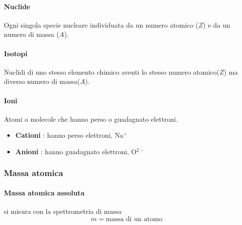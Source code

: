 \documentclass[twoside]{article}
\begin{document}
\paragraph[short]{Nuclide}
Ogni singola specie nucleare individuata da un numero atomico (\(Z\)) e da un numero di massa (\(A\)).
\begin{figure}[H]
  \centering
\end{figure}
\paragraph[short]{Isotopi}
Nuclidi di uno stesso elemento chimico aventi lo stesso numero atomico(\(Z\)) ma diverso numero di massa(\(A\)).
\begin{figure}[H]
  \centering
\end{figure}
\paragraph[short]{Ioni}
Atomi o molecole che hanno perso o guadagnato elettroni.
\begin{itemize}
  \item \textbf{Cationi} : hanno perso elettroni, Na$^+$
  \item \textbf{Anioni} : hanno guadagnato elettroni, O$^{2-}$
\end{itemize}

\subsubsection{Massa atomica}
\paragraph[short]{Massa atomica assoluta}
si misura con la spettrometria di massa
\begin{equation}
  \boxed{m = \text{massa di un atomo}}
\end{equation}
\end{document}

